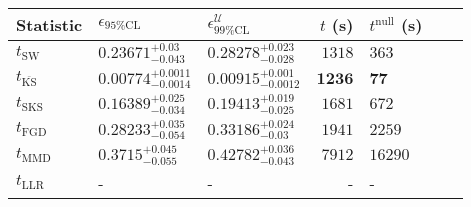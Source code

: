 \begin{tabular}{l|llr|llr}
	Statistic & $\epsilon_{95\%\mathrm{CL}}$ & $\epsilon^    {\mathcal{U}}_{99\%\mathrm{CL}}$ & $t$ (s) & $t^{\mathrm{null}}$ (s) \\
	\midrule
	$t_{\mathrm{SW}}$ & $0.23671_{-0.043}^{+0.03}$ & $0.28278_{-0.028}^{+0.023}$ & $1318$ & $363$ \\
	$t_{\overline{\mathrm{KS}}}$ & ${\mathbf{0.00774_{-0.0014}^{+0.0011}}}$ & ${\mathbf{0.00915_{-0.0012}^{+0.001}}}$ & ${\mathbf{1236}}$ & ${\mathbf{77}}$ \\
	$t_{\mathrm{SKS}}$ & $0.16389_{-0.034}^{+0.025}$ & $0.19413_{-0.025}^{+0.019}$ & $1681$ & $672$ \\
	$t_{\mathrm{FGD}}$ & $0.28233_{-0.054}^{+0.035}$ & $0.33186_{-0.03}^{+0.024}$ & $1941$ & $2259$ \\
	$t_{\mathrm{MMD}}$ & $0.3715_{-0.055}^{+0.045}$ & $0.42782_{-0.043}^{+0.036}$ & $7912$ & $16290$ \\
	$t_{\mathrm{LLR}}$ & - & - & - & - \\
	\bottomrule
\end{tabular}